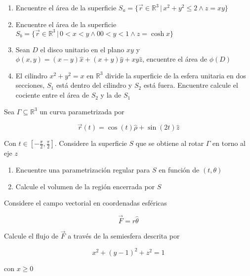 \begin{enumerate}[label=\alph*)]
    \item Encuentre el área de la superficie $S_a = \{\Vec{r}\in\mathbb{R}^3\,|\,x^2+y^2\leq 2\wedge z=xy\}$
    \item Encuentre el área de la superficie $S_b = \{\Vec{r}\in\mathbb{R}^3\,|\,0<x<y\wedge 00<y<1\wedge z=\cosh{x}\}$
    \item Sean $D$ el disco unitario en el plano $xy$ y $\phi(x,y)=(x-y)\hat{x}+(x+y)\hat{y}+xy\hat{z}$, encuentre el área de $\phi(D)$
    \item El cilindro $x^2+y^2=x$ en $\mathbb{R}^3$ divide la superficie de la esfera unitaria en dos secciones, $S_1$ está dentro del cilindro y $S_2$ está fuera. Encuentre calcule el cociente entre el área de $S_2$ y la de $S_1$
\end{enumerate}

\np

Sea $\Gamma\subseteq\mathbb{R}^3$ un curva parametrizada por

\[\Vec{r}(t) = \cos{(t)}\hat{\rho}+\sin{(2t)}\hat{z}\]

Con $t\in [-\frac{\pi}{2},\frac{\pi}{2}]$. Considere la superficie $S$ que se obtiene al rotar $\Gamma$ en torno al eje $z$

\begin{enumerate}[label=\alph*)]
    \item Encuentre una parametrización regular para $S$ en función de $(t, \theta)$
    \item Calcule el volumen de la región encerrada por $S$
\end{enumerate}

\np

Considere el campo vectorial en coordenadas esféricas

\[\Vec{F} = r\hat{\theta}\]

Calcule el flujo de $\Vec{F}$ a través de la semiesfera descrita por

\[x^2+(y-1)^2+z^2=1\]

con $x\geq 0$

\newpage